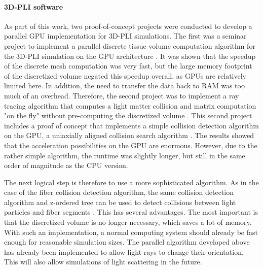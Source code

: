 \paragraph{\ac{3D-PLI} software}
% 
As part of this work, two proof-of-concept projects were conducted to develop a parallel GPU implementation for \ac{3D-PLI} simulations.
The first was a seminar project to implement a parallel discrete tissue volume computation algorithm for the \ac{3D-PLI} simulation on the \ac{GPU} architecture \cite{Kobusch:Seminar}.
It was shown that the speedup of the discrete mesh computation was very fast, but the large memory footprint of the discretized volume negated this speedup overall, as GPUs are relatively limited here.
In addition, the need to transfer the data back to \ac{RAM} was too much of an overhead.
Therefore, the second project was to implement a ray tracing algorithm that computes a light matter collision and matrix computation "on the fly" without pre-computing the discretized volume \cite{Kobusch:887783}.
This second project includes a proof of concept that implements a simple collision detection algorithm on the \ac{GPU}, a uniaxially aligned collision search algorithm \cite{Karras2012}.
The results showed that the acceleration possibilities on the \ac{GPU} are enormous.
However, due to the rather simple algorithm, the runtime was slightly longer, but still in the same order of magnitude as the \ac{CPU} version.
\par
% 
The next logical step is therefore to use a more sophisticated algorithm.
As in the case of the fiber collision detection algorithm, the same collision detection algorithm and z-ordered tree can be used to detect collisions between light particles and fiber segments \cite{Karras2012}.
This has several advantages.
The most important is that the discretized volume is no longer necessary, which saves a lot of memory.
With such an implementation, a normal computing system should already be fast enough for reasonable simulation sizes.
The parallel algorithm developed above has already been implemented to allow light rays to change their orientation.
This will also allow simulations of light scattering in the future.
% 
% 
% 

